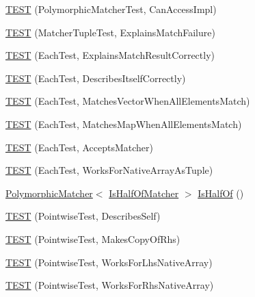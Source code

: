 \begin{DoxyCompactItemize}
\hyperlink{namespacetesting_1_1gmock__matchers__test_a918a64c4594ef6b30f53d735c2e6e6ac}{T\+E\+ST} (Polymorphic\+Matcher\+Test, Can\+Access\+Impl)
\item 
\hyperlink{namespacetesting_1_1gmock__matchers__test_abc9816afa3c83fc92e2c6ecfb2dd8e63}{T\+E\+ST} (Matcher\+Tuple\+Test, Explains\+Match\+Failure)
\item 
\hyperlink{namespacetesting_1_1gmock__matchers__test_adf46df588332aa839b52af952fface1a}{T\+E\+ST} (Each\+Test, Explains\+Match\+Result\+Correctly)
\item 
\hyperlink{namespacetesting_1_1gmock__matchers__test_a183c4b7acec060c6fe3dee650bc97e6d}{T\+E\+ST} (Each\+Test, Describes\+Itself\+Correctly)
\item 
\hyperlink{namespacetesting_1_1gmock__matchers__test_a1310e7e85bf8ea8f2281850167e15465}{T\+E\+ST} (Each\+Test, Matches\+Vector\+When\+All\+Elements\+Match)
\item 
\hyperlink{namespacetesting_1_1gmock__matchers__test_a53e7c1a04b8f178af52eeaa9f190cb64}{T\+E\+ST} (Each\+Test, Matches\+Map\+When\+All\+Elements\+Match)
\item 
\hyperlink{namespacetesting_1_1gmock__matchers__test_a74f7c802ddb6879d3c76ff08d3e242b9}{T\+E\+ST} (Each\+Test, Accepts\+Matcher)
\item 
\hyperlink{namespacetesting_1_1gmock__matchers__test_aef6eeafb03f698d16206836bbb6f05b9}{T\+E\+ST} (Each\+Test, Works\+For\+Native\+Array\+As\+Tuple)
\item 
\hyperlink{classtesting_1_1PolymorphicMatcher}{Polymorphic\+Matcher}$<$ \hyperlink{classtesting_1_1gmock__matchers__test_1_1IsHalfOfMatcher}{Is\+Half\+Of\+Matcher} $>$ \hyperlink{namespacetesting_1_1gmock__matchers__test_ace0a8f64b108c7a9c32c2cac15185461}{Is\+Half\+Of} ()
\item 
\hyperlink{namespacetesting_1_1gmock__matchers__test_a2c4c39058405e13e6c6b7fcf8e6bfe43}{T\+E\+ST} (Pointwise\+Test, Describes\+Self)
\item 
\hyperlink{namespacetesting_1_1gmock__matchers__test_a9be60ebc74e280d7eb6668bfa316a765}{T\+E\+ST} (Pointwise\+Test, Makes\+Copy\+Of\+Rhs)
\item 
\hyperlink{namespacetesting_1_1gmock__matchers__test_ad0e797104a482eba2d6c137cf9b676a5}{T\+E\+ST} (Pointwise\+Test, Works\+For\+Lhs\+Native\+Array)
\item 
\hyperlink{namespacetesting_1_1gmock__matchers__test_adabf6a3ceda0024d630d2ece31e37f7c}{T\+E\+ST} (Pointwise\+Test, Works\+For\+Rhs\+Native\+Array)
\item 

\end{DoxyCompactItemize}
